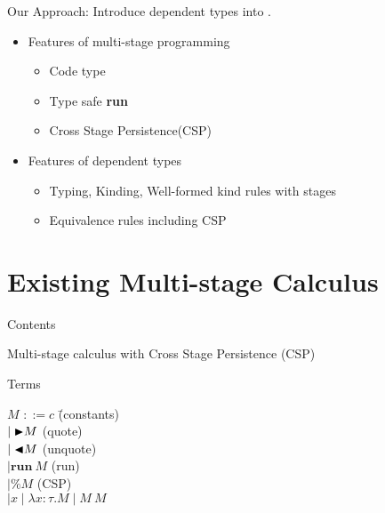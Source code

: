 \documentclass[dvipdfmx,aspectratio=169, 20pt]{beamer}
\begin{document}
\begin{frame}[fragile]{Our Approach: \LMD}
    Introduce dependent types into .
    \begin{itemize}
        \item Features of multi-stage programming
            \begin{itemize}
                \item Code type
                \item Type safe {\bf{run}}
                \item Cross Stage Persistence(CSP)
            \end{itemize}
        \item Features of dependent types
            \begin{itemize}
                \item Typing, Kinding, Well-formed kind rules with stages
                \item Equivalence rules including CSP
            \end{itemize}
    \end{itemize}
\end{frame}

\section{Existing Multi-stage Calculus \LTP}

\begin{frame}{Contents}
    \tableofcontents[currentsection]
  \note{
  }
\end{frame}

\begin{frame}[fragile]{}
    Multi-stage calculus with Cross Stage Persistence (CSP)
    \begin{block}{Terms}
    \begin{tabbing}
        \hspace{5mm} \( M \) \= \( ::= c \) \hspace{20mm} \= (constants) \\
        \> \( \mid {\mathop{\blacktriangleright}} M \) \> (quote) \\
        \> \( \mid {\mathop{\blacktriangleleft}} M \) \> (unquote) \\
        \> \( \mid \textbf{run}\ M \) \> (run) \\
        \> \( \mid \% M \) \> (CSP) \\
        \> \( \mid x \mid \lambda x:\tau.M \mid M\ M \) \\
    \end{tabbing}
    \end{block}
\end{frame}
\end{document}
